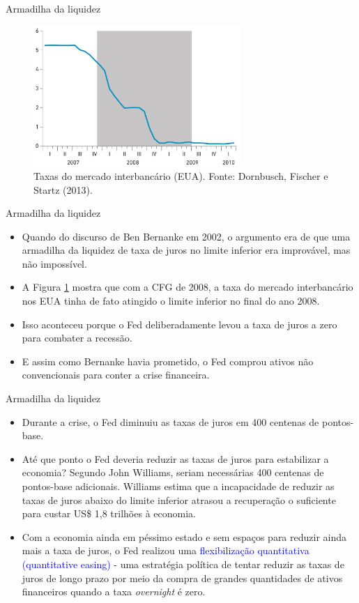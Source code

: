 \documentclass[10pt]{beamer}
\begin{document}
\begin{frame}{Armadilha da liquidez}
\begin{figure}
    \centering
    \includegraphics[width=0.7\textwidth]{./figures/aula102_fig4.JPG}
    \caption{Taxas do mercado interbancário (EUA). Fonte: Dornbusch, Fischer e Startz (2013).}
    \label{fig4}
\end{figure}
\end{frame}

\begin{frame}{Armadilha da liquidez}
\begin{itemize}
    \item Quando do discurso de Ben Bernanke em 2002, o argumento era de que uma armadilha da liquidez de taxa de juros no limite inferior era improvável, mas não impossível.
    \bigskip
    \item A Figura \ref{fig4} mostra que com a CFG de 2008, a taxa do mercado interbancário nos EUA tinha de fato atingido o limite inferior no final do ano 2008.
    \bigskip
    \item Isso aconteceu porque o Fed deliberadamente levou a taxa de juros a zero para combater a recessão.
    \bigskip
    \item E assim como Bernanke havia prometido, o Fed comprou ativos não convencionais para conter a crise financeira.
\end{itemize}
\end{frame}

\begin{frame}{Armadilha da liquidez}
\begin{itemize}
    \item Durante a crise, o Fed diminuiu as taxas de juros em 400 centenas de pontos-base.
    \bigskip
    \item Até que ponto o Fed deveria reduzir as taxas de juros para estabilizar a economia? Segundo John Williams, seriam necessárias 400 centenas de pontos-base adicionais. Williams estima que a incapacidade de reduzir as taxas de juros abaixo do limite inferior atrasou a recuperação o suficiente para custar US\$ 1,8 trilhões à economia.
    \bigskip
    \item Com a economia ainda em péssimo estado e sem espaços para reduzir ainda mais a taxa de juros, o Fed realizou uma \textcolor{blue}{flexibilização quantitativa (quantitative easing)} - uma estratégia política de tentar reduzir as taxas de juros de longo prazo por meio da compra de grandes quantidades de ativos financeiros quando a taxa \emph{overnight} é zero.
\end{itemize}
\end{frame}
\end{document}
